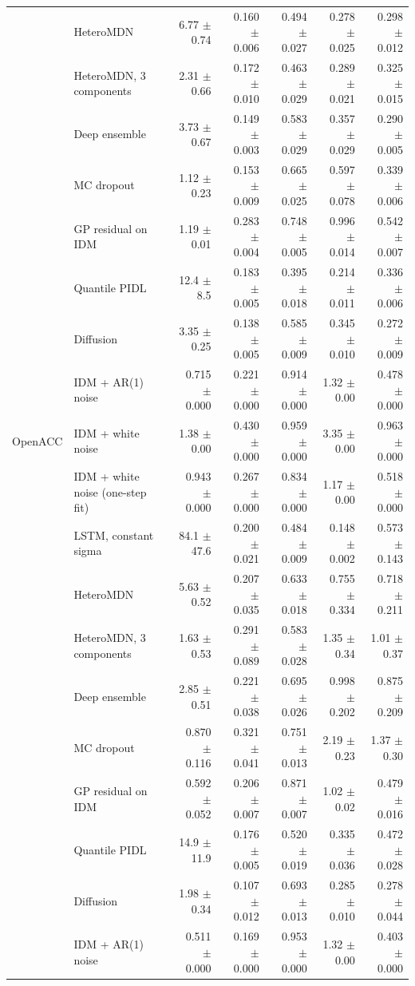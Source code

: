 \begin{longtable}{llrrrrr}
 & HeteroMDN & 6.77 $\pm$ 0.74 & 0.160 $\pm$ 0.006 & 0.494 $\pm$ 0.027 & 0.278 $\pm$ 0.025 & 0.298 $\pm$ 0.012 \\
 & HeteroMDN, 3 components & 2.31 $\pm$ 0.66 & 0.172 $\pm$ 0.010 & 0.463 $\pm$ 0.029 & 0.289 $\pm$ 0.021 & 0.325 $\pm$ 0.015 \\
 & Deep ensemble & 3.73 $\pm$ 0.67 & 0.149 $\pm$ 0.003 & 0.583 $\pm$ 0.029 & 0.357 $\pm$ 0.029 & 0.290 $\pm$ 0.005 \\
 & MC dropout & 1.12 $\pm$ 0.23 & 0.153 $\pm$ 0.009 & 0.665 $\pm$ 0.025 & 0.597 $\pm$ 0.078 & 0.339 $\pm$ 0.006 \\
 & GP residual on IDM & 1.19 $\pm$ 0.01 & 0.283 $\pm$ 0.004 & 0.748 $\pm$ 0.005 & 0.996 $\pm$ 0.014 & 0.542 $\pm$ 0.007 \\
 & Quantile PIDL & 12.4 $\pm$ 8.5 & 0.183 $\pm$ 0.005 & 0.395 $\pm$ 0.018 & 0.214 $\pm$ 0.011 & 0.336 $\pm$ 0.006 \\
 & Diffusion & 3.35 $\pm$ 0.25 & 0.138 $\pm$ 0.005 & 0.585 $\pm$ 0.009 & 0.345 $\pm$ 0.010 & 0.272 $\pm$ 0.009 \\
 & IDM + AR(1) noise & 0.715 $\pm$ 0.000 & 0.221 $\pm$ 0.000 & 0.914 $\pm$ 0.000 & 1.32 $\pm$ 0.00 & 0.478 $\pm$ 0.000 \\
\midrule
OpenACC & IDM + white noise & 1.38 $\pm$ 0.00 & 0.430 $\pm$ 0.000 & 0.959 $\pm$ 0.000 & 3.35 $\pm$ 0.00 & 0.963 $\pm$ 0.000 \\
 & IDM + white noise (one-step fit) & 0.943 $\pm$ 0.000 & 0.267 $\pm$ 0.000 & 0.834 $\pm$ 0.000 & 1.17 $\pm$ 0.00 & 0.518 $\pm$ 0.000 \\
 & LSTM, constant sigma & 84.1 $\pm$ 47.6 & 0.200 $\pm$ 0.021 & 0.484 $\pm$ 0.009 & 0.148 $\pm$ 0.002 & 0.573 $\pm$ 0.143 \\
 & HeteroMDN & 5.63 $\pm$ 0.52 & 0.207 $\pm$ 0.035 & 0.633 $\pm$ 0.018 & 0.755 $\pm$ 0.334 & 0.718 $\pm$ 0.211 \\
 & HeteroMDN, 3 components & 1.63 $\pm$ 0.53 & 0.291 $\pm$ 0.089 & 0.583 $\pm$ 0.028 & 1.35 $\pm$ 0.34 & 1.01 $\pm$ 0.37 \\
 & Deep ensemble & 2.85 $\pm$ 0.51 & 0.221 $\pm$ 0.038 & 0.695 $\pm$ 0.026 & 0.998 $\pm$ 0.202 & 0.875 $\pm$ 0.209 \\
 & MC dropout & 0.870 $\pm$ 0.116 & 0.321 $\pm$ 0.041 & 0.751 $\pm$ 0.013 & 2.19 $\pm$ 0.23 & 1.37 $\pm$ 0.30 \\
 & GP residual on IDM & 0.592 $\pm$ 0.052 & 0.206 $\pm$ 0.007 & 0.871 $\pm$ 0.007 & 1.02 $\pm$ 0.02 & 0.479 $\pm$ 0.016 \\
 & Quantile PIDL & 14.9 $\pm$ 11.9 & 0.176 $\pm$ 0.005 & 0.520 $\pm$ 0.019 & 0.335 $\pm$ 0.036 & 0.472 $\pm$ 0.028 \\
 & Diffusion & 1.98 $\pm$ 0.34 & 0.107 $\pm$ 0.012 & 0.693 $\pm$ 0.013 & 0.285 $\pm$ 0.010 & 0.278 $\pm$ 0.044 \\
 & IDM + AR(1) noise & 0.511 $\pm$ 0.000 & 0.169 $\pm$ 0.000 & 0.953 $\pm$ 0.000 & 1.32 $\pm$ 0.00 & 0.403 $\pm$ 0.000 \\
\end{longtable}
\endgroup
